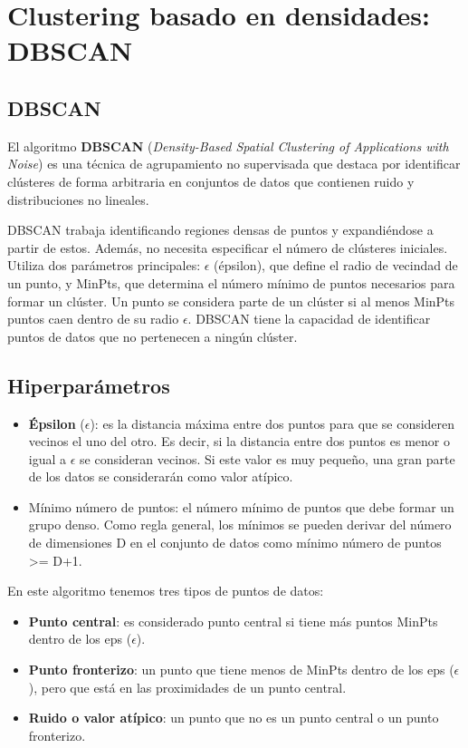 \chapter{Clustering basado en densidades: DBSCAN}\label{TEMA5}

\section{DBSCAN}

El algoritmo \textbf{DBSCAN} (\textit{Density-Based Spatial Clustering of Applications with Noise}) es una técnica de agrupamiento no supervisada que destaca por identificar clústeres de forma arbitraria en conjuntos de datos que
 contienen ruido y distribuciones no lineales.

DBSCAN trabaja identificando regiones densas de puntos y expandiéndose a partir de estos. Además, no necesita especificar el número de clústeres iniciales. Utiliza dos parámetros principales: $\epsilon$ (épsilon), que define el radio de vecindad de un punto, y MinPts, que determina el número mínimo de puntos necesarios para formar un clúster. Un punto se considera parte de un clúster si al menos MinPts puntos caen dentro de su radio $\epsilon$.  DBSCAN tiene la capacidad de identificar puntos de datos que no pertenecen a ningún clúster.

\section{Hiperparámetros}
\begin{itemize}
    \item \textbf{Épsilon} ($\epsilon$): es la distancia máxima entre dos puntos para que se consideren vecinos el uno del otro. Es decir, si la distancia entre dos puntos es menor o igual a $\epsilon$ se consideran vecinos. Si este valor es muy pequeño, una gran parte de los datos se considerarán como valor atípico.

    \item Mínimo número de puntos: el número mínimo de puntos que debe formar un grupo denso. Como regla general, los mínimos se pueden derivar del número de dimensiones D en el conjunto de datos como mínimo número de puntos >= D+1.
\end{itemize}


En este algoritmo tenemos tres tipos de puntos de datos:

\begin{itemize}
    \item  \textbf{Punto central}: es considerado punto central si tiene más puntos MinPts dentro de los eps ($\epsilon$).

    \item  \textbf{Punto fronterizo}: un punto que tiene menos de MinPts dentro de los eps ($\epsilon$), pero que está en las proximidades de un punto central.

    \item \textbf{Ruido o valor atípico}: un punto que no es un punto central o un punto fronterizo.
\end{itemize}

